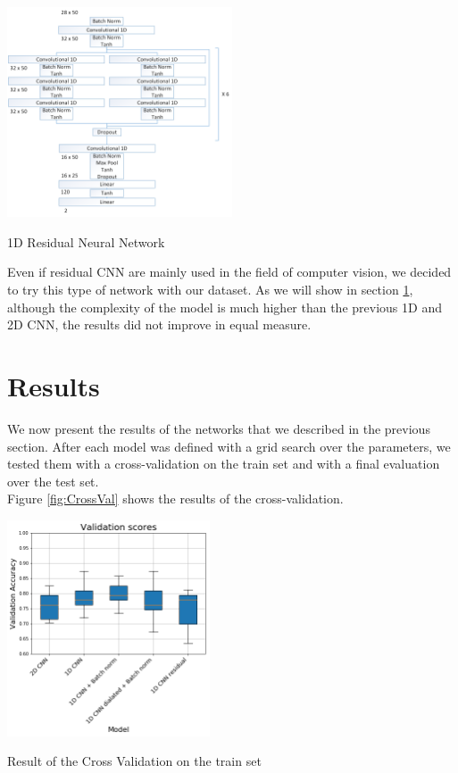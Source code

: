 \documentclass[10pt,conference,compsocconf]{IEEEtran}
\begin{document}
\begin{center}
	\captionsetup{type=figure}
	\includegraphics[width=0.5\textwidth]{img/Residual1D.png}
	\caption {1D Residual Neural Network}
	\label{fig:Residual}
\end{center}

Even if residual CNN are mainly used in the field of computer vision, we decided to try this type of network with our dataset. As we will show in section \ref{sec:results}, although the complexity of the model is much higher than the previous 1D and 2D CNN, the results did not improve in equal measure.

\section{Results}
\label{sec:results}
We now present the results of the networks that we described in the previous section. After each model was defined with a grid search over the parameters, we tested them with a cross-validation on the train set and with a final evaluation over the test set. \\
Figure \ref{fig:CrossVal} shows the results of the cross-validation.

\begin{center}
	\captionsetup{type=figure}
	\includegraphics[width=0.45\textwidth]{img/CrossVal.png}
	\caption {Result of the Cross Validation on the train set}
	\label{fig:CrossVal}
\end{center}
\end{document}
